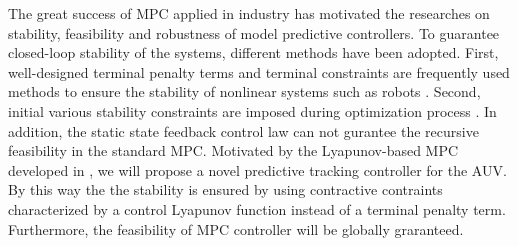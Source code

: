 \documentclass[journal,11pt,draftcls,onecolumn]{IEEEtran}
\begin{document}
The great success of MPC applied in industry has motivated the researches on stability, feasibility and robustness of model predictive controllers. To guarantee closed-loop stability of the systems, different methods have been adopted. First, well-designed terminal penalty terms and terminal constraints are frequently used methods to ensure the stability of nonlinear systems such as robots \cite{1645125}. Second, initial various stability constraints are imposed during optimization process \cite{wang2014distributed}. In addition, the static state feedback control law can not gurantee the recursive feasibility in the standard MPC. Motivated by the Lyapunov-based MPC developed in \cite{liu2017lyapunov}, we will propose a novel predictive tracking controller for the AUV. By this way the the stability is ensured by using contractive contraints characterized by a control Lyapunov function instead of a terminal penalty term. Furthermore, the feasibility of MPC controller will be globally graranteed.



 
\end{document}

